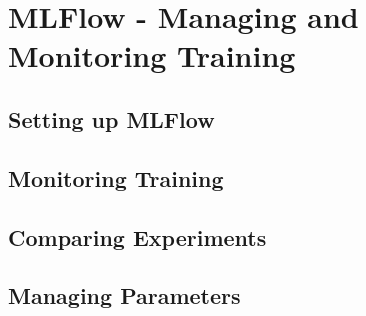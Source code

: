 \chapter{MLFlow - Managing and Monitoring Training}

\section{Setting up MLFlow}

\section{Monitoring Training}

\section{Comparing Experiments}

\section{Managing Parameters}

